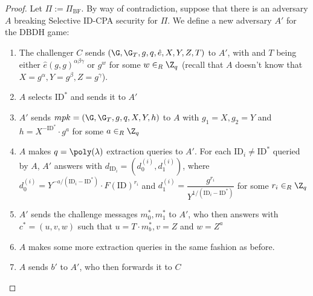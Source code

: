 \documentclass[a4paper, 12pt]{report}
\begin{document}
    \begin{proof}
        Let $\Pi := \Pi_{\mathrm{BF}}$. By way of contradiction, suppose that there is an adversary $A$ breaking Selective ID-CPA security for $\Pi$. We define a new adversary $A'$ for the DBDH game:
        \begin{enumerate}
            \item The challenger $C$ sends $(\G,\G_T,g,q, \hat e, X, Y, Z, T)$ to $A'$, with  and $T$ being either $\hat e(g,g)^{\alpha\beta\gamma}$ or $g^w$ for some $w \in_R \Z_q$ (recall that $A$ doesn't know that $X=g^\alpha, Y = g^{\beta}, Z = g^{\gamma}$).
            
            \item $A$ selects $\mathrm{ID}^*$ and sends it to $A'$
            \item $A'$ sends $mpk = (\G, \G_T, g, q, X, Y, h)$ to $A$ with $g_1 = X, g_2 = Y$ and $h = X^{-\mathrm{ID}^*} \cdot g^{a}$ for some $a \in_R \Z_q$
            \item $A$ makes $q = \poly(\lambda)$ extraction queries to $A'$. For each $\mathrm{ID}_i \neq \mathrm{ID}^*$ queried by $A$, $A'$ answers with $d_{\mathrm{ID}_i} = (d_0^{(i)}, d_1^{(i)})$, where $d_0^{(i)} = Y^{-a/(\mathrm{ID}_i-\mathrm{ID}^*)} \cdot F(\mathrm{ID})^{r_i}$ and $d_1^{(i)} = \dfrac{g^{r_i}}{Y^{1/(\mathrm{ID}_i-\mathrm{ID}^*)}}$ for some $r_i \in_R \Z_q$
            \item $A'$ sends the challenge messages $m_0^*, m_1^*$ to $A'$, who then answers with $c^* = (u,v,w)$ such that $u = T \cdot m_b^*, v =Z$ and $w = Z^{a}$
            \item $A$ makes some more extraction queries in the same fashion as before.
            \item $A$ sends $b'$ to $A'$, who then forwards it to $C$
        \end{enumerate}


\end{proof}
\end{document}
